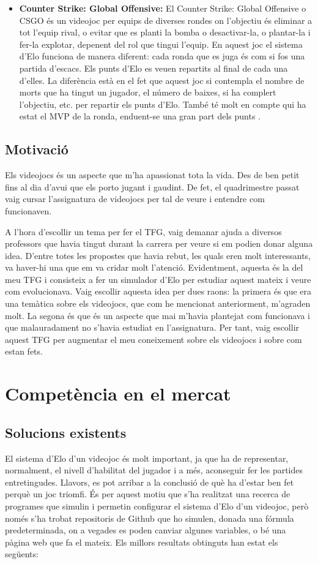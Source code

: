 \documentclass[a4paper]{article}
\begin{document}
\begin{itemize}
    \item \textbf{Counter Strike: Global Offensive:} El Counter Strike: Global Offensive o CSGO és un videojoc per equips de diverses rondes on l'objectiu és eliminar a tot l'equip rival, o evitar que es planti la bomba o desactivar-la, o plantar-la i fer-la explotar, depenent del rol que tingui l'equip.  En aquest joc el sistema d'Elo funciona de manera diferent: cada ronda que es juga és com si fos una partida d'escacs. Els punts d'Elo es veuen repartits al final de cada una d'elles. La diferència està en el fet que aquest joc si contempla el nombre de morts que ha tingut un jugador, el número de baixes, si ha complert l'objectiu, etc. per repartir els punts d'Elo. També té molt en compte qui ha estat el MVP de la ronda, enduent-se una gran part dels punts \cite{csgoELO1} \cite{csgoELO2}. 
\end{itemize}

\newpage
\subsection{Motivació}
Els videojocs és un aspecte que m'ha apassionat tota la vida. Des de ben petit fins al dia d'avui que els porto jugant i gaudint. De fet, el quadrimestre passat vaig cursar l'assignatura de videojocs per tal de veure i entendre com funcionaven.

A l'hora d'escollir un tema per fer el TFG, vaig demanar ajuda a diversos professors que havia tingut durant la carrera per veure si em podien donar alguna idea. D'entre totes les propostes que havia rebut, les quals eren molt interessants, va haver-hi una que em va cridar molt l'atenció. Evidentment, aquesta és la del meu TFG i consisteix a fer un simulador d'Elo per estudiar aquest mateix i veure com evolucionava. Vaig escollir aquesta idea per dues raons: la primera és que era una temàtica sobre els videojocs, que com he mencionat anteriorment, m'agraden molt. La segona és que és un aspecte que mai m'havia plantejat com funcionava i que malauradament no s'havia estudiat en l'assignatura. Per tant, vaig escollir aquest TFG per augmentar el meu coneixement sobre els videojocs i sobre com estan fets.


\newpage
\section{Competència en el mercat}
\subsection{Solucions existents}
El sistema d'Elo d'un videojoc és molt important, ja que ha de representar, normalment, el nivell d'habilitat del jugador i a més, aconseguir fer les partides entretingudes. Llavors, es pot arribar a la conclusió de què ha d'estar ben fet perquè un joc triomfi. És per aquest motiu que s'ha realitzat una recerca de programes que simulin i permetin configurar el sistema d'Elo d'un videojoc, però només s'ha trobat repositoris de Github que ho simulen, donada una fórmula predeterminada, on a vegades es poden canviar algunes variables, o bé una pàgina web que fa el mateix. Els millors resultats obtinguts han estat els següents:
\end{document}
